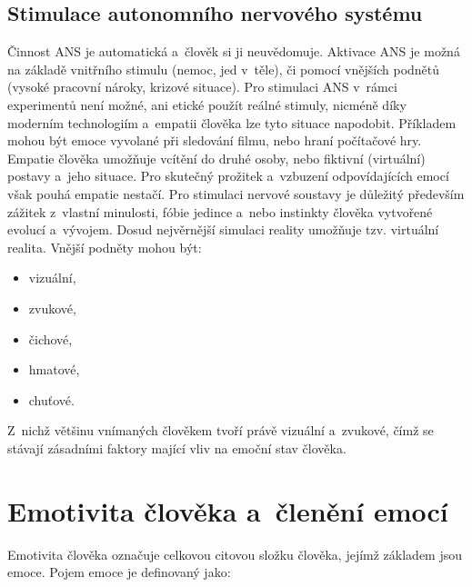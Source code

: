     \subsection{Stimulace autonomního nervového systému}
    Činnost ANS je automatická a~člověk si ji neuvědomuje. Aktivace ANS je možná na základě vnitřního stimulu (nemoc, jed v~těle), či pomocí vnějších podnětů (vysoké pracovní nároky, krizové situace). Pro stimulaci ANS v~rámci experimentů není možné, ani etické použít reálné stimuly, nicméně díky moderním technologiím a~empatii člověka lze tyto situace napodobit. Příkladem mohou být emoce vyvolané při sledování filmu, nebo hraní počítačové hry. Empatie člověka umožňuje vcítění do druhé osoby, nebo fiktivní (virtuální) postavy a~jeho situace. Pro skutečný prožitek a~vzbuzení odpovídajících emocí však pouhá empatie nestačí. Pro stimulaci nervové soustavy je důležitý především zážitek z~vlastní minulosti, fóbie jedince a~nebo instinkty člověka vytvořené evolucí a~vývojem. Dosud nejvěrnější simulaci reality umožňuje tzv. virtuální realita. Vnější podněty mohou být:
    \begin{itemize}
        \item vizuální,
        \item zvukové,
        \item čichové,
        \item hmatové,
        \item chuťové.
    \end{itemize}
    
    Z~nichž většinu vnímaných člověkem tvoří právě vizuální a~zvukové, čímž se stávají zásadními faktory mající vliv na emoční stav člověka. 
    
    \section{Emotivita člověka a~členění emocí}
    \label{emotivita}
    Emotivita člověka označuje celkovou citovou složku člověka, jejímž základem jsou emoce. Pojem emoce je definovaný jako: ~\cite{vykladovy_slovnik}
    


